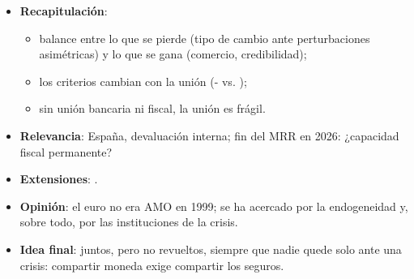 \documentclass{article}
\begin{document}
\begin{columnas}
\begin{itemize}
\item \textbf{Recapitulación}:
  \begin{itemize}
  \item balance entre lo que se pierde (tipo de cambio ante perturbaciones asimétricas) y lo que se gana (comercio, credibilidad);
  \item los criterios cambian con la unión (- vs. );
  \item sin unión bancaria ni fiscal, la unión es frágil.
  \end{itemize}
\item \textbf{Relevancia}: España, devaluación interna; fin del MRR en 2026: ¿capacidad fiscal permanente?
\item \textbf{Extensiones}:      .
\item \textbf{Opinión}: el euro no era AMO en 1999; se ha acercado por la endogeneidad y, sobre todo, por las instituciones de la crisis.
\item \textbf{Idea final}: juntos, pero no revueltos, siempre que nadie quede solo ante una crisis: compartir moneda exige compartir los seguros.
\end{itemize}


\end{columnas}
\end{document}

